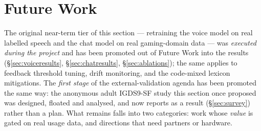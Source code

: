 \documentclass[11pt,a4paper]{article}
\begin{document}
\section{Future Work}
\label{sec:futurework}
The original near-term tier of this section --- retraining the voice model on real
labelled speech and the chat model on real gaming-domain data --- was \emph{executed
during the project} and has been promoted out of Future Work into the results
(\S\ref{sec:voiceresults}, \S\ref{sec:chatresults}, \S\ref{sec:ablations}); the same
applies to feedback threshold tuning, drift monitoring, and the code-mixed lexicon
mitigations. The \emph{first stage} of the external-validation agenda has been
promoted the same way: the anonymous adult IGDS9-SF study this section once
proposed was designed, floated and analysed, and now reports as a result
(\S\ref{sec:survey}) rather than a plan. What remains falls into two categories:
work whose \emph{value} is gated on real usage data, and directions that need
partners or hardware.
\end{document}
